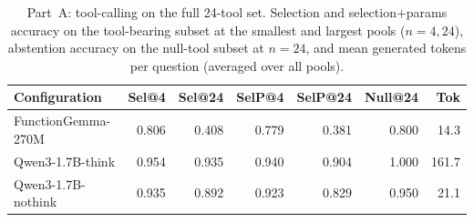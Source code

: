 \begin{table}[H]
\centering
\caption{Part~A: tool-calling on the full 24-tool set. Selection and selection+params accuracy on the tool-bearing subset at the smallest and largest pools ($n{=}4,24$), abstention accuracy on the null-tool subset at $n{=}24$, and mean generated tokens per question (averaged over all pools).}
\label{tab:partA}
\begin{tabular}{lrrrrrr}
\toprule
Configuration & Sel@4 & Sel@24 & SelP@4 & SelP@24 & Null@24 & Tok \\
\midrule
FunctionGemma-270M & 0.806 & 0.408 & 0.779 & 0.381 & 0.800 & 14.3 \\
Qwen3-1.7B-think & 0.954 & 0.935 & 0.940 & 0.904 & 1.000 & 161.7 \\
Qwen3-1.7B-nothink & 0.935 & 0.892 & 0.923 & 0.829 & 0.950 & 21.1 \\
\bottomrule
\end{tabular}
\end{table}
